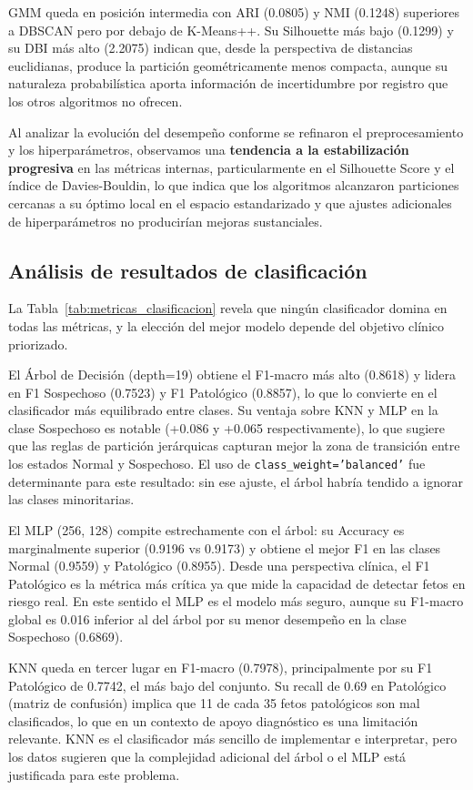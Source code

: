 \documentclass[12pt,letterpaper]{article}
\begin{document}
GMM queda en posición intermedia con ARI (0.0805) y NMI (0.1248) superiores a DBSCAN
pero por debajo de K-Means++. Su Silhouette más bajo (0.1299) y su DBI más alto
(2.2075) indican que, desde la perspectiva de distancias euclidianas, produce la
partición geométricamente menos compacta, aunque su naturaleza probabilística aporta
información de incertidumbre por registro que los otros algoritmos no ofrecen.
 
Al analizar la evolución del desempeño conforme se refinaron el preprocesamiento y los
hiperparámetros, observamos una \textbf{tendencia a la estabilización progresiva} en
las métricas internas, particularmente en el Silhouette Score y el índice de
Davies-Bouldin, lo que indica que los algoritmos alcanzaron particiones cercanas a su
óptimo local en el espacio estandarizado y que ajustes adicionales de hiperparámetros
no producirían mejoras sustanciales.
 
\subsection{Análisis de resultados de clasificación}
 
La Tabla~\ref{tab:metricas_clasificacion} revela que ningún clasificador domina en todas
las métricas, y la elección del mejor modelo depende del objetivo clínico priorizado.
 
El Árbol de Decisión (depth=19) obtiene el F1-macro más alto (0.8618) y lidera en
F1 Sospechoso (0.7523) y F1 Patológico (0.8857), lo que lo convierte en el clasificador
más equilibrado entre clases. Su ventaja sobre KNN y MLP en la clase Sospechoso es
notable (+0.086 y +0.065 respectivamente), lo que sugiere que las reglas de partición
jerárquicas capturan mejor la zona de transición entre los estados Normal y Sospechoso.
El uso de \texttt{class\_weight='balanced'} fue determinante para este resultado: sin ese
ajuste, el árbol habría tendido a ignorar las clases minoritarias.
 
El MLP (256, 128) compite estrechamente con el árbol: su Accuracy es marginalmente
superior (0.9196 vs 0.9173) y obtiene el mejor F1 en las clases Normal (0.9559) y
Patológico (0.8955). Desde una perspectiva clínica, el F1 Patológico es la métrica más
crítica ya que mide la capacidad de detectar fetos en riesgo real. En este sentido el
MLP es el modelo más seguro, aunque su F1-macro global es 0.016 inferior al del árbol
por su menor desempeño en la clase Sospechoso (0.6869).
 
KNN queda en tercer lugar en F1-macro (0.7978), principalmente por su F1 Patológico de
0.7742, el más bajo del conjunto. Su recall de 0.69 en Patológico (matriz de confusión)
implica que 11 de cada 35 fetos patológicos son mal clasificados, lo que en un contexto
de apoyo diagnóstico es una limitación relevante. KNN es el clasificador más sencillo
de implementar e interpretar, pero los datos sugieren que la complejidad adicional del
árbol o el MLP está justificada para este problema.
 
\end{document}
